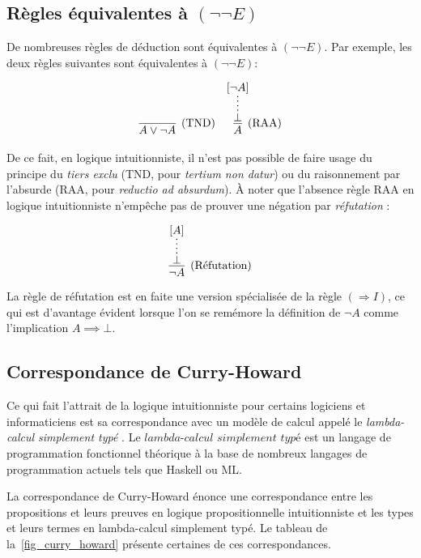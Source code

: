 \subsection{Règles équivalentes à $({\neg}{\neg}E)$}

De nombreuses règles de déduction sont équivalentes à $({\neg}{\neg}E)$. Par exemple, les deux règles suivantes sont équivalentes à $({\neg}{\neg}E)$:

\begin{align*}
\infer[(\text{TND})]{A \vee \neg A}{} &&
\infer[(\text{RAA})]{A}{\infer*{\bot}{[\neg A]}}
\end{align*}

De ce fait, en logique intuitionniste, il n'est pas possible de faire usage du principe du \textit{tiers exclu} (TND, pour \textit{tertium non datur}) ou du raisonnement par l'absurde (RAA, pour \textit{reductio ad absurdum}). À noter que l'absence règle RAA en logique intuitionniste n'empêche pas de prouver une négation par \og \textit{réfutation} \fg{}:

\[
\infer[(\text{Réfutation})]{\neg A}{\infer*{\bot}{[A]}}
\]

La règle de réfutation est en faite une version spécialisée de la règle $({\Rightarrow}I)$, ce qui est d'avantage évident lorsque l'on se remémore la définition de $\neg A$ comme l'implication $A \implies \bot$.

\subsection{Correspondance de Curry-Howard}

Ce qui fait l'attrait de la logique intuitionniste pour certains logiciens et informaticiens est sa correspondance avec un modèle de calcul appelé le \og \textit{lambda-calcul simplement typé} \fg{}. Le $\textit{lambda-calcul simplement typé}$ est un langage de programmation fonctionnel théorique à la base de nombreux langages de programmation actuels tels que Haskell ou ML.

La correspondance de Curry-Howard énonce une correspondance entre les propositions et leurs preuves en logique propositionnelle intuitionniste et les types et leurs termes en lambda-calcul simplement typé. Le tableau de la~\cref{fig_curry_howard} présente certaines de ces correspondances.

